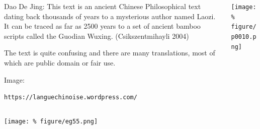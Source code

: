 \documentclass[unknownkeysallowed,usepdftitle=false, aspectratio=169, parskip=full]{beamer}
\newcommand{\secvariable}{nothing}
\newcommand{\mysection}[1]{\renewcommand{\secvariable}{#1}
}
\begin{document}
\mysection{radar}
\begin{frame}\label{\secvariable}
  \begin{columns}[t]
    \begin{column}[c]{0.45\textwidth}
    \parbox{\linewidth}{

   Dao De Jing: This text is an ancient Chinese Philosophical text dating back thousands of years to a mysterious author named Laozi. It can be traced as far as 2500 years to a set of ancient bamboo scripts called the Guodian Wuxing. (Csikszentmihayli 2004)
      
      \vspace{12pt}
      
	  The text is quite confusing and there are many translations, most of which are public domain or fair use. 
     
     \vspace{2mm}
     Image:
      
  \texttt{https://languechinoise.wordpress.com/}   

            }
    \end{column}
    \begin{column}[c]{0.45\textwidth}
\texttt{[image: \%
figure/p0010.png]}\\
\vspace{12pt}

    \end{column}
  \end{columns}

  
\end{frame}

\mysection{line}
\begin{frame}\label{\secvariable}
\begin{center}
  \vspace{-0.5cm}
 \texttt{[image: \%
  figure/eg55.png]}
\end{center}
  \vspace{-0.5cm}
  
  
\end{frame}
\end{document}

